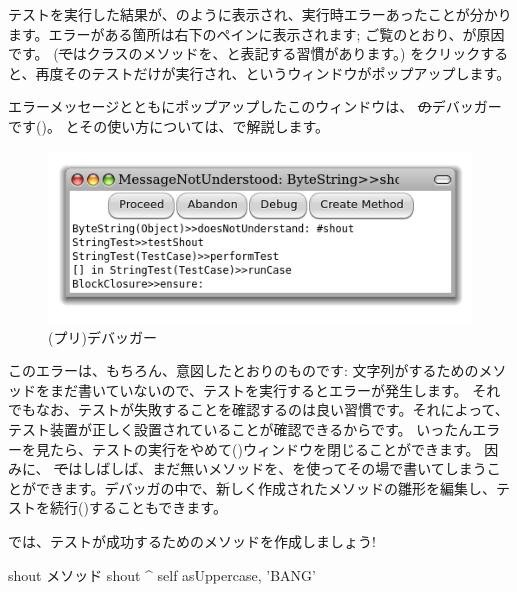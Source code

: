 \documentclass[a4paper,10pt,twoside]{book}
\begin{document}
テストを実行した結果が、のように表示され、実行時エラーあったことが分かります。エラーがある箇所は右下のペインに表示されます; ご覧のとおり、が原因です。
(\st ではクラスのメソッドを、と表記する習慣があります。)
 をクリックすると、再度そのテストだけが実行され、というウィンドウがポップアップします。

エラーメッセージとともにポップアップしたこのウィンドウは、 \st のデバッガーです()。
とその使い方については、で解説します。

\begin{figure}[hbt]
\centerline {\includegraphics[width=\textwidth]{Predebugger}}
\caption{(プリ)デバッガー}
\end{figure}

このエラーは、もちろん、意図したとおりのものです: 文字列がするためのメソッドをまだ書いていないので、テストを実行するとエラーが発生します。
それでもなお、テストが失敗することを確認するのは良い習慣です。それによって、テスト装置が正しく設置されていることが確認できるからです。
いったんエラーを見たら、テストの実行をやめて()ウィンドウを閉じることができます。
因みに、 \st ではしばしば、まだ無いメソッドを、を使ってその場で書いてしまうことができます。デバッガの中で、新しく作成されたメソッドの雛形を編集し、テストを続行()することもできます。

では、テストが成功するためのメソッドを作成しましょう!

\begin{method}[shout]{shout メソッド}
shout
	^ self asUppercase, 'BANG'
\end{method}
\end{document}
